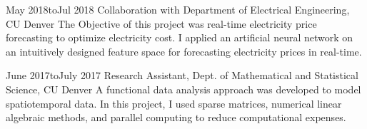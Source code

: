 \vspace{-0.6cm}

\jobs
{May 2018}{to}{Jul 2018}
{Collaboration with Department of Electrical Engineering, CU Denver}
{The Objective of this project was real-time electricity price forecasting to optimize electricity cost. I applied an artificial neural network on an intuitively designed feature space for forecasting electricity prices in real-time.}

\vspace{-0.6cm}

\jobs
{June 2017}{to}{July 2017}
{Research Assistant, Dept. of Mathematical and Statistical Science, CU Denver}
{A functional data analysis approach was developed to model spatiotemporal data. In this project, I used sparse matrices, numerical linear algebraic methods, and parallel computing to reduce computational expenses.}
